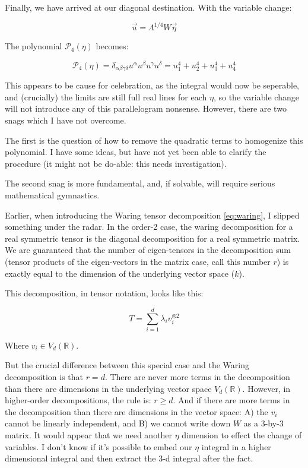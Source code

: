 \documentclass[10pt,letterpaper]{article}
\begin{document}
Finally, we have arrived at our diagonal destination. With the variable change:

$$ \vec{u} = \Lambda^{1/4} W \vec{\eta} $$

The polynomial $\mathcal{P}_4(\eta)$ becomes:

\begin{equation} \label{eq:etaform_eigen_niii}
\mathcal{P}_4(\eta) =  \delta_{\alpha \beta \gamma \delta} u^{\alpha} u^{\beta} u^{\gamma} u^{\delta} = u_1^4 + u_2^4 + u_3^4 + u_4^4
\end{equation}

This appears to be cause for celebration, as the integral would now be seperable, and (crucially) the limits are still full real lines for each $\eta$, so the variable change will not introduce any of this parallelogram nonsense. However, there are two snags which I have not overcome.

The first is the question of how to remove the quadratic terms to homogenize this polynomial. I have some ideas, but have not yet been able to clarify the procedure (it might not be do-able: this needs investigation).

The second snag is more fundamental, and, if solvable, will require serious mathematical gymnastics.

Earlier, when introducing the Waring tensor decomposition \ref{eq:waring}, I slipped something under the radar. In the order-2 case, the waring decomposition for a real symmetric tensor is the diagonal decomposition for a real symmetric matrix. We are guaranteed that the number of eigen-tensors in the decomposition sum (tensor products of the eigen-vectors in the matrix case, call this number $r$) is exactly equal to the dimension of the underlying vector space ($k$).

This decomposition, in tensor notation, looks like this:

\begin{equation} \label{eq:waring-o2}
T = \sum_{i=1}^d \lambda_i v_i^{\otimes 2}
\end{equation} 

Where $v_i \in V_d(\mathbb{R})$.

But the crucial difference between this special case and the Waring decomposition is that $r=d$. There are never more terms in the decomposition than there are dimensions in the underlying vector space $V_d(\mathbb{R})$. However, in higher-order decompositions, the rule is: $r\geq d$. And if there are more terms in the decomposition than there are dimensions in the vector space: A) the $v_i$ cannot be linearly independent, and B) we cannot write down $W$ as a 3-by-3 matrix. It would appear that we need another $\eta$ dimension to effect the change of variables. I don't know if it's possible to embed our $\eta$ integral in a higher dimensional integral and then extract the 3-d integral after the fact.
\end{document}
